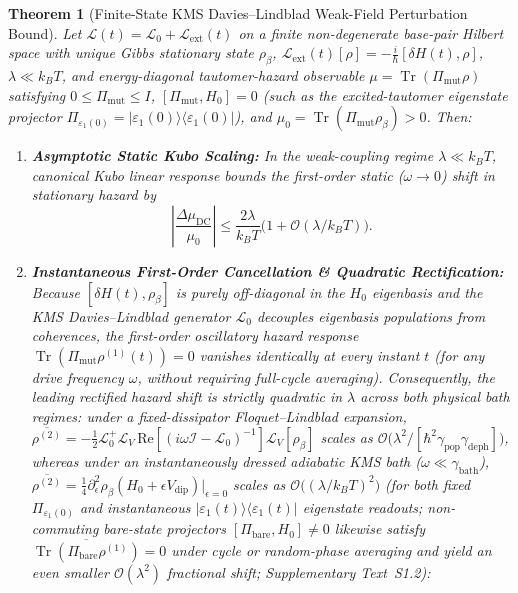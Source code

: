 \documentclass[10pt,letterpaper]{article}
\theoremstyle{plain}
\newtheorem{theorem}{Theorem}
\theoremstyle{definition}
\newcommand{\Lcal}{\mathcal{L}}
\newcommand{\Tr}{\operatorname{Tr}}
\begin{document}
\begin{theorem}[Finite-State KMS Davies--Lindblad Weak-Field Perturbation Bound]
\label{thm:nogo}
Let $\Lcal(t) = \Lcal_0 + \Lcal_{\mathrm{ext}}(t)$ on a finite non-degenerate base-pair Hilbert space with unique Gibbs stationary state $\rho_\beta$, $\Lcal_{\mathrm{ext}}(t)[\rho] = -\frac{i}{\hbar}[\delta H(t), \rho]$, $\lambda \ll k_B T$, and energy-diagonal tautomer-hazard observable $\mu = \Tr(\Pi_{\mathrm{mut}}\rho)$ satisfying $0 \le \Pi_{\mathrm{mut}} \le I$, $[\Pi_{\mathrm{mut}}, H_0] = 0$ (such as the excited-tautomer eigenstate projector $\Pi_{\varepsilon_1(0)} = |\varepsilon_1(0)\rangle\langle\varepsilon_1(0)|$), and $\mu_0 = \Tr(\Pi_{\mathrm{mut}}\rho_\beta) > 0$. Then:
\begin{enumerate}[label=(\roman*),leftmargin=2em,itemsep=2pt]
    \item \textbf{Asymptotic Static Kubo Scaling:} In the weak-coupling regime $\lambda \ll k_B T$, canonical Kubo linear response bounds the first-order static ($\omega \to 0$) shift in stationary hazard by
    \begin{equation}
        \left|\frac{\Delta\mu_{\mathrm{DC}}}{\mu_0}\right| \le \frac{2\lambda}{k_B T}\bigl(1 + \mathcal{O}(\lambda / k_B T)\bigr).
        \label{eq:dc_bound}
    \end{equation}
    \item \textbf{Instantaneous First-Order Cancellation \& Quadratic Rectification:} Because $[\delta H(t), \rho_\beta]$ is purely off-diagonal in the $H_0$ eigenbasis and the KMS Davies--Lindblad generator $\Lcal_0$ decouples eigenbasis populations from coherences, the first-order oscillatory hazard response $\Tr(\Pi_{\mathrm{mut}}\rho^{(1)}(t)) = 0$ vanishes identically at every instant $t$ (for any drive frequency $\omega$, without requiring full-cycle averaging). Consequently, the leading rectified hazard shift is strictly quadratic in $\lambda$ across both physical bath regimes: under a fixed-dissipator Floquet--Lindblad expansion, $\overline{\rho^{(2)}} = -\frac{1}{2}\Lcal_0^+\Lcal_V\,\mathrm{Re}[(i\omega\mathcal{I} - \Lcal_0)^{-1}]\Lcal_V[\rho_\beta]$ scales as $\mathcal{O}\bigl(\lambda^2 / [\hbar^2 \gamma_{\mathrm{pop}}\gamma_{\mathrm{deph}}]\bigr)$, whereas under an instantaneously dressed adiabatic KMS bath ($\omega \ll \gamma_{\mathrm{bath}}$), $\overline{\rho^{(2)}} = \frac{1}{4}\partial_\epsilon^2 \rho_\beta(H_0 + \epsilon V_{\mathrm{dip}})|_{\epsilon=0}$ scales as $\mathcal{O}\bigl((\lambda / k_B T)^2\bigr)$ (for both fixed $\Pi_{\varepsilon_1(0)}$ and instantaneous $|\varepsilon_1(t)\rangle\langle\varepsilon_1(t)|$ eigenstate readouts; non-commuting bare-state projectors $[\Pi_{\mathrm{bare}}, H_0] \neq 0$ likewise satisfy $\overline{\Tr(\Pi_{\mathrm{bare}}\rho^{(1)})} = 0$ under cycle or random-phase averaging and yield an even smaller $\mathcal{O}(\lambda^2)$ fractional shift; Supplementary Text~S1.2):

\end{enumerate}
\end{theorem}
\end{document}
